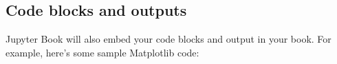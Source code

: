 \documentclass[letterpaper,10pt,english]{sphinxmanual}
\begin{document}
\subsection{Code blocks and outputs}
\label{\detokenize{notebooks:code-blocks-and-outputs}}
Jupyter Book will also embed your code blocks and output in your book.
For example, here’s some sample Matplotlib code:

\begin{sphinxVerbatim}[commandchars=\\\{\}]
    
   
   
\end{sphinxVerbatim}
\end{document}

